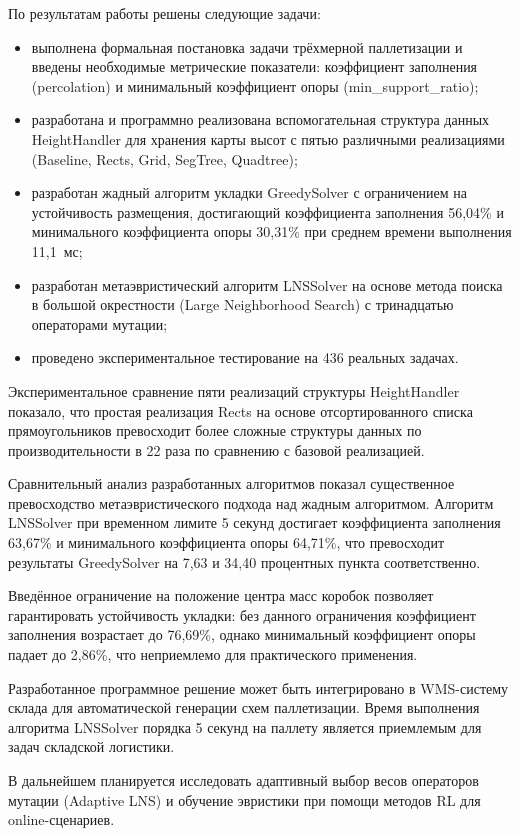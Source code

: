 \Conclusion %

По результатам работы решены следующие задачи:
\begin{itemize}
  \item выполнена формальная постановка задачи трёхмерной паллетизации и введены необходимые метрические показатели: коэффициент заполнения (percolation) и минимальный коэффициент опоры (min\_support\_ratio);
  \item разработана и программно реализована вспомогательная структура данных HeightHandler для хранения карты высот с пятью различными реализациями (Baseline, Rects, Grid, SegTree, Quadtree);
  \item разработан жадный алгоритм укладки GreedySolver с ограничением на устойчивость размещения, достигающий коэффициента заполнения 56,04\% и минимального коэффициента опоры 30,31\% при среднем времени выполнения 11,1~мс;
  \item разработан метаэвристический алгоритм LNSSolver на основе метода поиска в большой окрестности (Large Neighborhood Search) с тринадцатью операторами мутации;
  \item проведено экспериментальное тестирование на 436 реальных задачах.
\end{itemize}

Экспериментальное сравнение пяти реализаций структуры HeightHandler показало, что простая реализация Rects на основе отсортированного списка прямоугольников превосходит более сложные структуры данных по производительности в 22 раза по сравнению с базовой реализацией.

Сравнительный анализ разработанных алгоритмов показал существенное превосходство метаэвристического подхода над жадным алгоритмом. Алгоритм LNSSolver при временном лимите 5 секунд достигает коэффициента заполнения 63,67\% и минимального коэффициента опоры 64,71\%, что превосходит результаты GreedySolver на 7,63 и 34,40 процентных пункта соответственно.

Введённое ограничение на положение центра масс коробок позволяет гарантировать устойчивость укладки: без данного ограничения коэффициент заполнения возрастает до 76,69\%, однако минимальный коэффициент опоры падает до 2,86\%, что неприемлемо для практического применения.

Разработанное программное решение может быть интегрировано в WMS-систему склада для автоматической генерации схем паллетизации. Время выполнения алгоритма LNSSolver порядка 5 секунд на паллету является приемлемым для задач складской логистики.

В дальнейшем планируется исследовать адаптивный выбор весов операторов мутации (Adaptive LNS) и обучение эвристики при помощи методов RL для online-сценариев.
